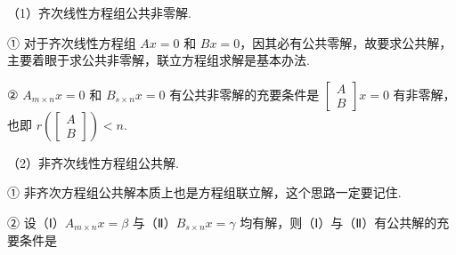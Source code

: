 
（1）齐次线性方程组公共非零解.

① 对于齐次线性方程组 $Ax=0$ 和 $Bx=0$，因其必有公共零解，故要求公共解，主要着眼于求公共非零解，联立方程组求解是基本办法.

② $A_{m\times n}x=0$ 和 $B_{s\times n}x=0$ 有公共非零解的充要条件是 $\begin{bmatrix}A\\B\end{bmatrix}x=0$ 有非零解，也即 $r\left(\begin{bmatrix}A\\B\end{bmatrix}\right)<n$.

（2）非齐次线性方程组公共解.

① 非齐次方程组公共解本质上也是方程组联立解，这个思路一定要记住.

② 设（Ⅰ）$A_{m\times n}x=\beta$ 与（Ⅱ）$B_{s\times n}x=\gamma$ 均有解，则（Ⅰ）与（Ⅱ）有公共解的充要条件是


